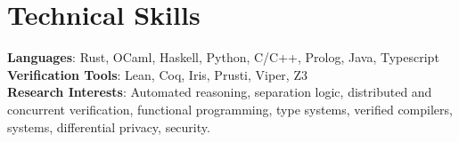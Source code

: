 \documentclass[letterpaper,11pt]{article}
\begin{document}
%
\section{Technical Skills}
 \begin{itemize}[leftmargin=0.15in, label={}]
    \small{\item{
     \textbf{Languages}{: Rust, OCaml, Haskell, Python, C/C++, Prolog, Java, Typescript } \\
     \textbf{Verification Tools}{: Lean, Coq, Iris, Prusti, Viper, Z3} \\
     \textbf{Research Interests}{: Automated reasoning, separation logic, distributed and concurrent verification, functional programming, type systems, verified compilers, systems, differential privacy, security. }
    }}
 \end{itemize}


\end{document}
